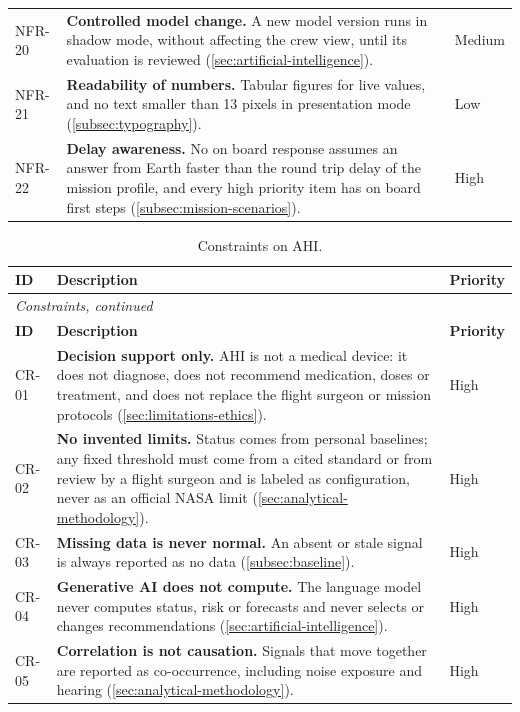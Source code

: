 {\begin{longtable}{p{1.5cm}p{10.8cm}p{1.5cm}}
NFR-20 & \textbf{Controlled model change.} A new model version runs in shadow mode, without affecting the crew view, until its evaluation is reviewed (\ref{sec:artificial-intelligence}). & Medium \\
NFR-21 & \textbf{Readability of numbers.} Tabular figures for live values, and no text smaller than 13 pixels in presentation mode (\ref{subsec:typography}). & Low \\
NFR-22 & \textbf{Delay awareness.} No on board response assumes an answer from Earth faster than the round trip delay of the mission profile, and every high priority item has on board first steps (\ref{subsec:mission-scenarios}). & High \\
\end{longtable}
}

{\footnotesize
\begin{longtable}{p{1.5cm}p{10.8cm}p{1.5cm}}
\caption{Constraints on AHI.}
\label{tab:req-constraints}\\
\hline
\textbf{ID} & \textbf{Description} & \textbf{Priority} \\
\hline
\endfirsthead
\multicolumn{3}{l}{\textit{Constraints, continued}} \\
\hline
\textbf{ID} & \textbf{Description} & \textbf{Priority} \\
\hline
\endhead
\hline
\endfoot
\hline
\endlastfoot
CR-01 & \textbf{Decision support only.} AHI is not a medical device: it does not diagnose, does not recommend medication, doses or treatment, and does not replace the flight surgeon or mission protocols (\ref{sec:limitations-ethics}). & High \\
CR-02 & \textbf{No invented limits.} Status comes from personal baselines; any fixed threshold must come from a cited standard or from review by a flight surgeon and is labeled as configuration, never as an official NASA limit (\ref{sec:analytical-methodology}). & High \\
CR-03 & \textbf{Missing data is never normal.} An absent or stale signal is always reported as no data (\ref{subsec:baseline}). & High \\
CR-04 & \textbf{Generative AI does not compute.} The language model never computes status, risk or forecasts and never selects or changes recommendations (\ref{sec:artificial-intelligence}). & High \\
CR-05 & \textbf{Correlation is not causation.} Signals that move together are reported as co-occurrence, including noise exposure and hearing (\ref{sec:analytical-methodology}). & High \\

\end{longtable}}
